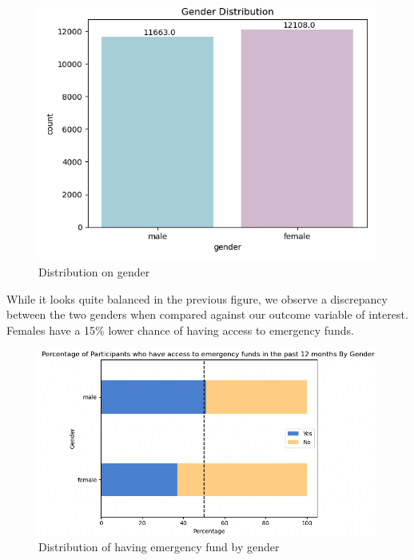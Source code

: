 \documentclass[12pt]{article}
\begin{document}
\begin{figure}

{\centering \includegraphics[width=1\linewidth]{graphs/f24_graph2} 

}

\caption{Distribution on gender}\label{fig:unnamed-chunk-4}
\end{figure}

While it looks quite balanced in the previous figure, we observe a
discrepancy between the two genders when compared against our outcome
variable of interest. Females have a 15\% lower chance of having access
to emergency funds.

\begin{figure}

{\centering \includegraphics[width=1\linewidth]{graphs/f24_graph3} 

}

\caption{Distribution of having emergency fund by gender}\label{fig:unnamed-chunk-5}
\end{figure}
\end{document}
